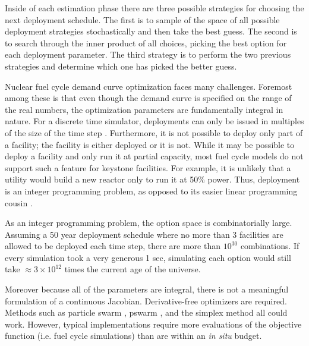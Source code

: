 Inside of each estimation phase there are three possible strategies for
choosing the next deployment schedule.  The first is to sample of the
space of all possible deployment strategies stochastically and then take the
best guess.  The second is to search through the inner product of all choices,
picking the best option for each deployment parameter. The third strategy
is to perform the two previous strategies and determine which one has picked
the better guess.

Nuclear fuel cycle demand curve optimization faces many challenges.
Foremost among these is that even though the demand curve is specified on
the range of the real numbers, the optimization parameters are fundamentally
integral in nature. For a discrete time simulator, deployments can only
be issued in multiples of the size of the time step
\cite{kelton2000simulation}. Furthermore,
it is not possible to deploy only part of a facility; the facility is either
deployed or it is not. While it may be possible to deploy a facility and
only run it at partial capacity, most fuel cycle models do not support such
a feature for
keystone facilities.  For example, it is unlikely that a utility would build
a new reactor only to run it at 50\% power. Thus, deployment is an integer
programming problem, as opposed to its easier linear programming cousin
\cite{vanderbei2001linear}.

As an integer programming problem, the option space is combinatorially
large. Assuming a 50 year deployment schedule where no more than 3 facilities
are allowed to be deployed each time step, there are more than $10^{30}$
combinations. If every simulation took a very generous 1 sec, simulating
each option would still take $\approx 3\times10^{12}$ times the current age
of the universe.

Moreover because all of the parameters are integral, there is not a
meaningful formulation of a continuous Jacobian. Derivative-free optimizers are
required. Methods such as particle swarm \cite{kennedy2010particle},
pswarm \cite{vaz2009pswarm}, and the
simplex method \cite{vanderbei2001linear} all could work.  However, typical
implementations require
more evaluations of the objective function (i.e. fuel cycle simulations)
than are within an \emph{in situ} budget.

